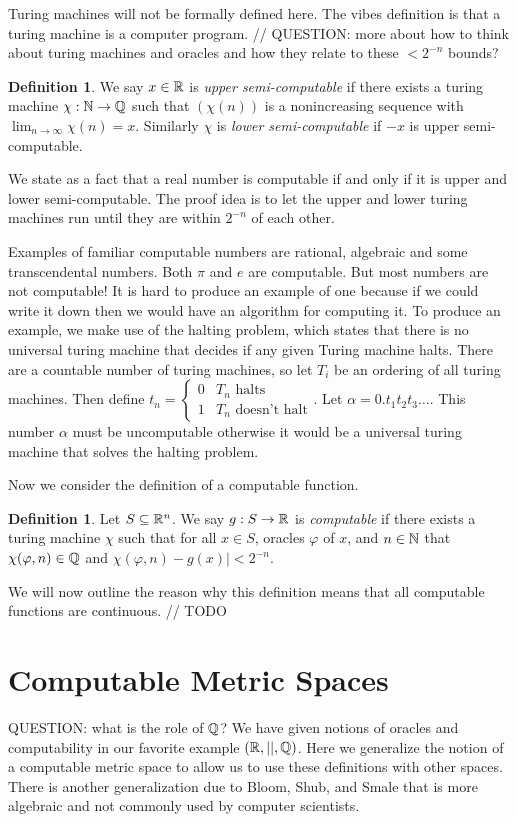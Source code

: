 \documentclass[11pt, reqno]{amsart}
\theoremstyle{plain}
\theoremstyle{definition}
\newtheorem{defn}[thm]{Definition}
\begin{document}
Turing machines will not be formally defined here. The vibes definition is that a turing machine is a computer program. // QUESTION: more about how to think about turing machines and oracles and how they relate to these $< 2^{-n}$ bounds?

\begin{defn}
    We say $x \in \mathbb{R}$ is \textit{upper semi-computable} if there exists a turing machine $\chi: \mathbb{N} \rightarrow \mathbb{Q}$ such that $(\chi(n))$ is a nonincreasing sequence with $\lim_{n \rightarrow \infty} \chi(n) = x$.
    Similarly $\chi$ is \textit{lower semi-computable} if $-x$ is upper semi-computable.
\end{defn}

We state as a fact that a real number is computable if and only if it is upper and lower semi-computable. The proof idea is to let the upper and lower turing machines run until they are within $2^{-n}$ of each other. 

Examples of familiar computable numbers are rational, algebraic and some transcendental numbers. Both $\pi$ and $e$ are computable. But most numbers are not computable! It is hard to produce an example of one because if we could write it down then we would have an algorithm for computing it. To produce an example, we make use of the halting problem, which states that there is no universal turing machine that decides if any given Turing machine halts. There are a countable number of turing machines, so let $T_i$ be an ordering of all turing machines. Then define $t_n = \begin{cases}
    0 & T_n \text{ halts} \\
    1 & T_n \text{ doesn't halt}
\end{cases}$. Let $\alpha = 0.t_1t_2t_3\dots$. This number $\alpha$ must be uncomputable otherwise it would be a universal turing machine that solves the halting problem. 

Now we consider the definition of a computable function.
\begin{defn}
    Let $S \subseteq \mathbb{R}^n$. We say $g: S \rightarrow \mathbb{R}$ is \textit{computable} if there exists a turing machine $\chi$ such that for all $x \in S$, oracles $\varphi$ of $x$, and $n \in \mathbb{N}$ that $\chi(\varphi, n) \in \mathbb{Q}$ and $\chi(\varphi, n) - g(x)| < 2^{-n}$.
\end{defn}

We will now outline the reason why this definition means that all computable functions are continuous. // TODO

\section{Computable Metric Spaces}
QUESTION: what is the role of $\mathbb{Q}$?
We have given notions of oracles and computability in our favorite example $(\mathbb{R}, ||, \mathbb{Q})$. Here we generalize the notion of a computable metric space to allow us to use these definitions with other spaces. There is another generalization due to Bloom, Shub, and Smale that is more algebraic and not commonly used by computer scientists.
\end{document}
